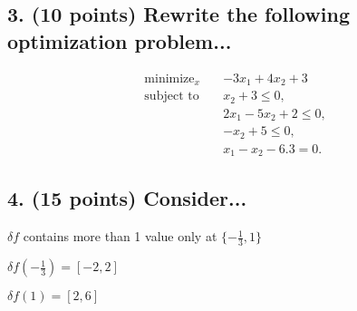 \documentclass[a4paper,10pt]{article}
\theoremstyle{definition}
\begin{document}
\bigskip
\subsection*{3. (10 points) Rewrite the following optimization problem...}

\[
\begin{aligned}
    \text{minimize}_{x} \quad & -3x_1 + 4x_2 + 3 \\
    \text{subject to} \quad & x_2 + 3 \leq 0, \\
                            & 2x_1 - 5x_2 + 2 \leq 0, \\
                            & -x_2 + 5 \leq 0, \\
                            & x_1 - x_2 - 6.3 = 0.
\end{aligned}
\]

\bigskip
\subsection*{4. (15 points) Consider...}

$\delta f$ contains more than 1 value only at $\{-\frac{1}{3}, 1\}$

$\delta f(-\frac{1}{3}) = [-2, 2]$

$\delta f(1) = [2, 6]$
\end{document}
